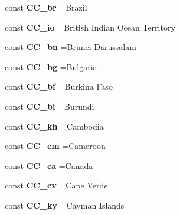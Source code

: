 \begin{DoxyCompactItemize}
const {\bfseries C\+C\+\_\+br} =\textquotesingle{}Brazil\textquotesingle{}
\item 
\hypertarget{class_i_s_o_a9612992591fc481d71d164a891d20ffd}{}\label{class_i_s_o_a9612992591fc481d71d164a891d20ffd} 
const {\bfseries C\+C\+\_\+io} =\textquotesingle{}British Indian Ocean Territory\textquotesingle{}
\item 
\hypertarget{class_i_s_o_a8d3537901fd9f7a04b0b00d03d51e392}{}\label{class_i_s_o_a8d3537901fd9f7a04b0b00d03d51e392} 
const {\bfseries C\+C\+\_\+bn} =\textquotesingle{}Brunei Darussalam\textquotesingle{}
\item 
\hypertarget{class_i_s_o_aa82437be22f8b7f72af24c314655e747}{}\label{class_i_s_o_aa82437be22f8b7f72af24c314655e747} 
const {\bfseries C\+C\+\_\+bg} =\textquotesingle{}Bulgaria\textquotesingle{}
\item 
\hypertarget{class_i_s_o_a33fe546ce28384f1b11d91845b912a95}{}\label{class_i_s_o_a33fe546ce28384f1b11d91845b912a95} 
const {\bfseries C\+C\+\_\+bf} =\textquotesingle{}Burkina Faso\textquotesingle{}
\item 
\hypertarget{class_i_s_o_a551c26da8d3bfdb5269032ccecf630a8}{}\label{class_i_s_o_a551c26da8d3bfdb5269032ccecf630a8} 
const {\bfseries C\+C\+\_\+bi} =\textquotesingle{}Burundi\textquotesingle{}
\item 
\hypertarget{class_i_s_o_af39501ec83776d07cde2b689ae7b50f3}{}\label{class_i_s_o_af39501ec83776d07cde2b689ae7b50f3} 
const {\bfseries C\+C\+\_\+kh} =\textquotesingle{}Cambodia\textquotesingle{}
\item 
\hypertarget{class_i_s_o_aff13938190d5a2453f62d7b40853c610}{}\label{class_i_s_o_aff13938190d5a2453f62d7b40853c610} 
const {\bfseries C\+C\+\_\+cm} =\textquotesingle{}Cameroon\textquotesingle{}
\item 
\hypertarget{class_i_s_o_a9b62191df86333ff4b6deb9dc7566764}{}\label{class_i_s_o_a9b62191df86333ff4b6deb9dc7566764} 
const {\bfseries C\+C\+\_\+ca} =\textquotesingle{}Canada\textquotesingle{}
\item 
\hypertarget{class_i_s_o_a2457c77da85be8baae655bae00f514e7}{}\label{class_i_s_o_a2457c77da85be8baae655bae00f514e7} 
const {\bfseries C\+C\+\_\+cv} =\textquotesingle{}Cape Verde\textquotesingle{}
\item 
\hypertarget{class_i_s_o_ac67fc7612cc1b0e4b3cd6a6c7525b47d}{}\label{class_i_s_o_ac67fc7612cc1b0e4b3cd6a6c7525b47d} 
const {\bfseries C\+C\+\_\+ky} =\textquotesingle{}Cayman Islands\textquotesingle{}
\item 
\hypertarget{class_i_s_o_a3d25c268d084fd4a06f322e80d001adc}{}\label{class_i_s_o_a3d25c268d084fd4a06f322e80d001adc} 

\end{DoxyCompactItemize}
